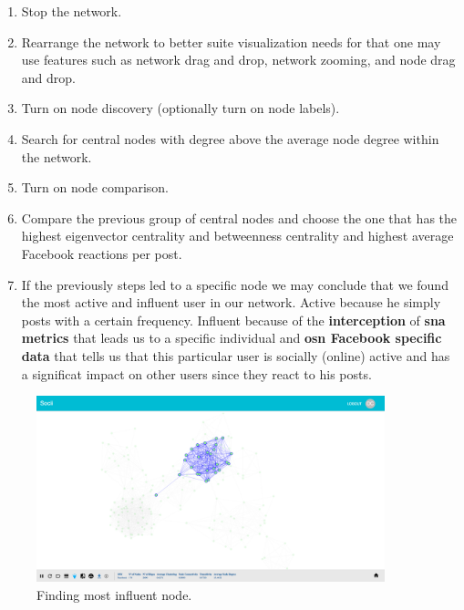 \begin{enumerate}
    \item Stop the network.
    \item Rearrange the network to better suite visualization needs for that one may use features such as network drag and drop, network zooming, and node drag and drop.
    \item Turn on node discovery (optionally turn on node labels).
    \item Search for central nodes with degree above the average node degree within the network.
    \item Turn on node comparison.
    \item Compare the previous group of central nodes and choose the one that has the highest eigenvector centrality
    and betweenness centrality and highest average Facebook reactions per post.
    \item If the previously steps led to a specific node we may conclude that we found the most active and influent user in our network. Active because he simply posts with a certain frequency. Influent because of the \textbf{interception} of \textbf{\gls{sna} metrics} that leads us to a specific individual and \textbf{\gls{osn} Facebook specific data} that tells us that this particular user is socially (online) active and has a significat impact on other users since they react to his posts.
\end{enumerate}

\begin{figure}[h!]
\begin{center}
  \hspace*{-0.8in}
  \includegraphics[width=0.9\textwidth]{img/socii/socii_12.png}
\end{center}
\caption{\label{img:socii_12} Finding most influent node.}
\end{figure}

